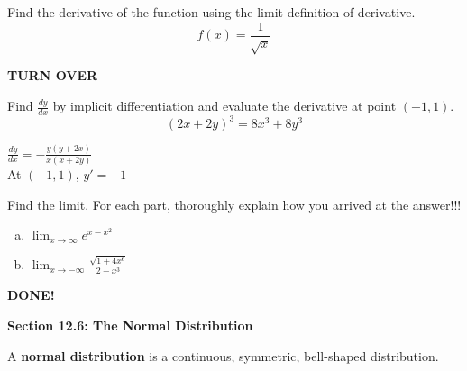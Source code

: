 \documentclass[english,lecture,12pt]{gWmaths}
\begin{document}
\begin{Exercise}
Find the derivative of the function using the limit definition of derivative. $$f(x) = \frac{1}{\sqrt{x}}$$
\vspace{8 in}
\end{Exercise}

\centerline{\bf TURN OVER}
\vfill\eject


\begin{Exercise}
Find $\frac{dy}{dx}$ by implicit differentiation and evaluate the derivative at point $(-1, 1)$.
$$(2x + 2y)^3 = 8x^3 + 8y^3$$
\vspace{0.3 in}

$\frac{dy}{dx} = -\frac{y(y + 2x)}{x (x + 2y)}$ \\

At $(-1, 1)$, $y' = -1$
\end{Exercise}

\vspace{0.3 in}


\begin{Exercise}
Find the limit. For each part, thoroughly explain how you arrived at the answer!!! 
\begin{enumerate}[a)]
\item  $\lim_{x \to \infty} e^{x - x^2}$
\vspace{4 in}
\item  $\lim_{x \to -\infty} \frac{\sqrt{1 + 4x^6}}{2 - x^3}$
\vspace{4 in}
\end{enumerate}
\end{Exercise}

\centerline{\bf DONE!}
\vfill\eject




\noindent
\textbf{Section 12.6: The Normal Distribution}\\


\begin{Def}
A \textbf{normal distribution} is a continuous, symmetric, bell-shaped distribution. \\
\end{Def}


\noindent
\textbf{}
\end{document}
